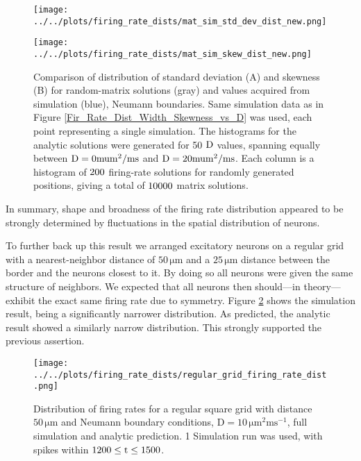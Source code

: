 \documentclass[10pt,a4paper]{article}
\begin{document}
\begin{figure}
\begin{minipage}{0.5\textwidth}
\texttt{[image: ../../plots/firing\_rate\_dists/mat\_sim\_std\_dev\_dist\_new.png]}
\end{minipage}
\begin{minipage}{0.5\textwidth}
\texttt{[image: ../../plots/firing\_rate\_dists/mat\_sim\_skew\_dist\_new.png]}
\end{minipage}
\caption{Comparison of distribution of standard deviation (A) and skewness (B) for random-matrix solutions (gray) and values acquired from simulation (blue), Neumann boundaries. Same simulation data as in Figure \ref{Fir_Rate_Dist_Width_Skewness_vs_D} was used, each point representing a single simulation. The histograms for the analytic solutions were generated for 50 $\rm D$ values, spanning equally between $\rm D=0 mu m^2 /ms$ and $\rm D=20 mu m^2 /ms$. Each column is a histogram of $\rm 200$ firing-rate solutions for randomly generated positions, giving a total of $\rm 10000$ matrix solutions.}
\label{Std_Skew_Dist_vs_Data}
\end{figure}
In summary, shape and broadness of the firing rate distribution appeared to be strongly determined by fluctuations in the spatial distribution of neurons.

To further back up this result we arranged excitatory neurons on a regular grid with a nearest-neighbor distance of $\mathrm{50\, \mu m}$ and a $\mathrm{25\, \mu m}$ distance between the border and the neurons closest to it. By doing so all neurons were given the same structure of neighbors. We expected that all neurons then should---in theory---exhibit the exact same firing rate due to symmetry. Figure \ref{Fir_Rate_Dist_Reg_Grid} shows the simulation result, being a significantly narrower distribution. As predicted, the analytic result showed a similarly narrow distribution. This strongly supported the previous assertion.
\begin{figure}
\begin{center}
\texttt{[image: ../../plots/firing\_rate\_dists/regular\_grid\_firing\_rate\_dist.png]}
\end{center}
\caption{Distribution of firing rates for a regular square grid with distance $\mathrm{50\, \mu m}$ and Neumann boundary conditions, $\mathrm{D=10\,\mu m^2 ms^{-1}}$, full simulation and analytic prediction. 1 Simulation run was used, with spikes within $\rm 1200 \leq t \leq 1500$.}
\label{Fir_Rate_Dist_Reg_Grid}
\end{figure}  
\end{document}
